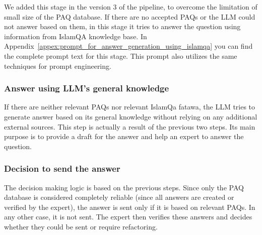 We added this stage in the version 3 of the pipeline, to overcome the limitation of small size of the PAQ database. If there are no accepted PAQs or the LLM could not answer based on them, in this stage it tries to answer the question using information from IslamQA knowledge base. In Appendix~\ref{appex:prompt_for_answer_generation_using_islamqa} you can find the complete prompt text for this stage. This prompt also utilizes the same techniques for prompt engineering.

\subsubsection{Answer using LLM's general knowledge}

If there are neither relevant PAQs nor relevant IslamQa fatawa, the LLM tries to generate answer based on its general knowledge without relying on any additional external sources. This step is actually a result of the previous two steps. Its main purpose is to provide a draft for the answer and help an expert to answer the question.

\subsubsection{Decision to send the answer}

The decision making logic is based on the previous steps. Since only the PAQ database is considered completely reliable (since all answers are created or verified by the expert), the answer is sent only if it is based on relevant PAQs. In any other case, it is not sent. The expert then verifies these answers and decides whether they could be sent or require refactoring.





